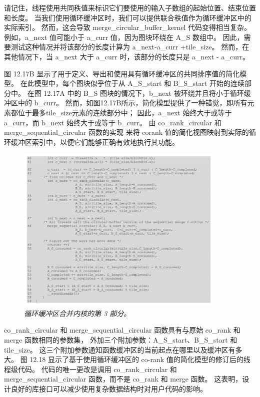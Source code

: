 请记住，线程使用共同秩值来标识它们要使用的输入子数组的起始位置、结束位置和长度。 
当我们使用循环缓冲区时，我们可以提供联合秩值作为循环缓冲区中的实际索引。 
然而，这会导致 merge\_circular\_buffer\_kernel 代码变得相当复杂。 
例如，a\_next 值可能小于 a\_curr 值，因为图块环绕在 A\_S 数组中。 
因此，需要测试这种情况并将该部分的长度计算为 a\_next-a\_curr +tile\_size。 
然而，在其他情况下，当 a\_next 大于 a\_curr 时，该部分的长度只是 a\_next - a\_curr。

图 12.17B 显示了用于定义、导出和使用具有循环缓冲区的共同排序值的简化模型。 
在此模型中，每个图块似乎位于从 A\_S\_start 和 B\_S\_start 开始的连续部分中。 
在图 12.17A 中的 B\_S 图块的情况下，b\_next 被环绕并且将小于循环缓冲区中的 b\_curr。 
然而，如图12.17B所示，简化模型提供了一种错觉，即所有元素都位于最多tile\_size元素的连续部分中； 
因此，a\_next 始终大于或等于 a\_curr，而 b\_next 始终大于或等于 b\_curr。 
由 co\_rank\_circular 和 merge\_sequential\_circular 函数的实现
来将 corank 值的简化视图映射到实际的循环缓冲区索引中，以便它们能够正确有效地执行其功能。

\begin{figure}[H]
	\centering
	\includegraphics[width=0.9\textwidth]{figs/F12.18.png}
	\caption{\textit{循环缓冲区合并内核的第 3 部分。}}
\end{figure}

co\_rank\_circular 和 merge\_sequential\_circular 函数具有与原始 co\_rank 和 merge 函数相同的参数集，
外加三个附加参数：A\_S\_start、B\_S\_start 和tile\_size。 
这三个附加参数通知函数缓冲区的当前起点在哪里以及缓冲区有多大。 
图 12.18 显示了基于使用循环缓冲区的 co-rank 值的简化模型的修订后的线程级代码。 
代码的唯一更改是调用 co\_rank\_circular 和 merge\_sequential\_circular 函数，而不是 co\_rank 和 merge 函数。 
这表明，设计良好的库接口可以减少使用复杂数据结构时对用户代码的影响。

